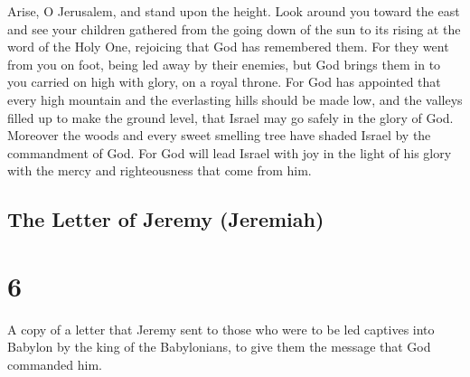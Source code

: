  Arise, O Jerusalem, and stand upon the height. Look around
you toward the east and see your children gathered from the going down
of the sun to its rising at the word of the Holy One, rejoicing that God
has remembered them.  For they went from you on foot, being
led away by their enemies, but God brings them in to you carried on high
with glory, on a royal throne.  For God has appointed that
every high mountain and the everlasting hills should be made low, and
the valleys filled up to make the ground level, that Israel may go
safely in the glory of God.  Moreover the woods and every
sweet smelling tree have shaded Israel by the commandment of God.
 For God will lead Israel with joy in the light of his glory
with the mercy and righteousness that come from him.

\hypertarget{the-letter-of-jeremy-jeremiah}{%
\subsection{The Letter of Jeremy
(Jeremiah)}\label{the-letter-of-jeremy-jeremiah}}

\hypertarget{section-5}{%
\section{6}\label{section-5}}

 A copy of a letter that Jeremy sent to those who were to be
led captives into Babylon by the king of the Babylonians, to give them
the message that God commanded him.

